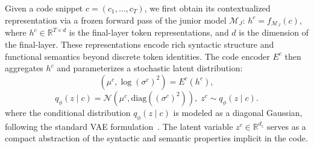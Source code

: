 \documentclass{article}
\theoremstyle{plain}
\theoremstyle{definition}
\theoremstyle{remark}
\begin{document}
Given a code snippet $c = (c_1, \dots, c_T)$, we first obtain its contextualized representation via a frozen forward pass of the junior model $\mathcal{M}_J$: $h^c = f_{\mathcal{M}_J}(c)$, where $h^c \in \mathbb{R}^{T \times d}$ is the final-layer token representations, and $d$ is the dimension of the final-layer.
These representations encode rich syntactic structure and functional semantics beyond discrete token identities. The code encoder $E^c$ then aggregates $h^c$ and parameterizes a stochastic latent distribution:
\begin{equation*}
(\mu^c, \log (\sigma^c)^2) = E^c(h^c),
\end{equation*}
\begin{equation*}
q_\phi(z \mid c) = \mathcal{N}(\mu^c, \mathrm{diag}((\sigma^c)^2)), 
\; z^c \sim q_\phi(z \mid c).
\end{equation*}
where the conditional distribution $q_\phi(z \mid c)$ is modeled as a diagonal Gaussian, following the standard VAE formulation~\cite{kingma2013auto}. The latent variable $z^c\in \mathbb{R}^{d_z}$ serves as a compact abstraction of the syntactic and semantic properties implicit in the code.
\end{document}
